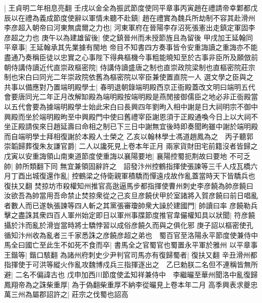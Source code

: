 |{
	王貞明二年相息亮翻}
壬戌以金全為振武節度使同平章事丙寅趙在禮請帝幸鄴都戊辰以在禮為義成節度使辭以軍情未聽不赴鎮|{
	趙在禮實為魏兵所劫制不容其赴滑州}
李彦超入朝帝曰河東無虞爾之力也|{
	河東軍府在晉陽李存沼死張憲出走鎮定軍固李彦超之力也}
庚午以為建雄留後|{
	使之鎮晉州而未授節旌且為留後}
甲戌加王延翰同平章事|{
	王延翰承其先業據有閩地}
帝目不知書四方奏事皆令安重誨讀之重誨亦不能盡通乃奏稱臣徒以忠實之心事陛下得典樞機今事粗能曉知至於古事非臣所及願倣前朝侍講侍讀近代直崇政樞密院|{
	侍講侍讀盛唐之制也直崇政院梁制也直樞密院莊宗制也宋白曰同光二年崇政院依舊為樞密院以宰臣兼使置直院一人}
選文學之臣與之共事以備應對乃置端明殿學士|{
	春明退朝錄端明殿西京正衙殿蓋改文明曰端明五代會要唐同光二年正月改解缷殿為端明殿按端明殿是燕閒接御儒臣之地必非正衙殿當以五代會要為據端明殿學士始此宋白曰長興四年劉昫入相中謝是日大祠明宗不御中興殿而坐於端明殿昫至中興殿門中使曰舊禮宰臣謝恩須于正殿通喚今日上以大祠不坐正殿請俟來日趙延壽曰命相之制已下三日中謝無宜後時即奏聞昫雖中謝於端明殿而自端明學士拜相復謝於本殿人士榮之}
乙亥以翰林學士馮道趙鳳為之　丙子聽郭崇韜歸葬復朱友謙官爵|{
	二人以讒死見上卷本年正月}
兩家貨財田宅前籍沒者皆歸之　戊寅以安重誨領山南東道節度使重誨以襄陽要地|{
	襄陽控蜀扼荆故曰要地}
不可乏帥|{
	帥所類翻下同}
無宜兼領固辭許之　詔發汴州控鶴指揮使張諫等三千人戍瓦橋六月丁酉出城復還作亂|{
	控鶴梁之侍衛親軍積驕而憚遠戍故作亂蓋當時天下皆驕兵也復扶又翻}
焚掠坊市殺權知州推官高逖逼馬步都指揮使曹州刺史李彦饒為帥彦饒曰汝欲吾為帥當用吾命禁止焚掠衆從之己亥旦彦饒伏甲於室諸將入賀彦饒曰前日唱亂者數人而已遂執張諫等四人斬之其黨張審瓊帥衆大譟於建國門|{
	帥讀曰率}
彦饒勒兵擊之盡誅其衆四百人軍州始定即日以軍州事牒節度推官韋儼權知具以狀聞|{
	符彦饒攝於汴而亂於滑豈當時將士驕悖習以成俗彦饒久而與之俱化邪}
庚子詔以樞密使孔循知汴州收為亂者三千家悉誅之彦饒彦超之弟也　蜀百官至洛陽永平節度使兼侍中馬全曰國亡至此生不如死不食而卒|{
	書馬全之官蜀官也蜀置永平軍於雅州}
以平章事王鍇等|{
	鍇口駭翻}
為諸州府刺史少尹判官司馬亦有復歸蜀者|{
	復扶又翻}
辛丑滑州都指揮使于可洪等縱火作亂攻魏博戍兵三指揮逐出之　乙巳勅朕二名但不連稱皆無所避|{
	二名不偏諱古也}
戊申加西川節度使孟知祥兼侍中　李繼曮至華州聞洛中亂復歸鳳翔帝為之誅柴重厚|{
	為于偽翻柴重厚不納李從曮見上卷本年二月}
高季興表求夔忠萬三州為屬郡詔許之|{
	莊宗之伐蜀也詔高}


